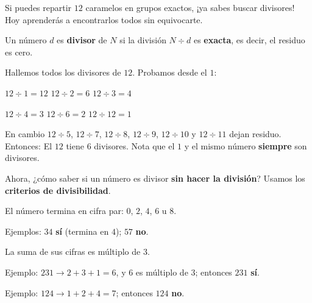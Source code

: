 \documentclass{xgodel-ficha}
\begin{document}
\portada

\begin{ficha}

\begin{pensamiento}
Si puedes repartir $12$ caramelos en grupos exactos, ¡ya sabes buscar
divisores! Hoy aprenderás a encontrarlos todos sin equivocarte.
\end{pensamiento}

Un número $d$ es \textbf{divisor} de $N$ si la división $N \div d$ es
\textbf{exacta}, es decir, el residuo es cero.


Hallemos todos los divisores de $12$. Probamos desde el $1$:
\par\smallskip
$12 \div 1 = 12$ \quad $12 \div 2 = 6$ \quad $12 \div 3 = 4$
\par\smallskip
$12 \div 4 = 3$ \quad $12 \div 6 = 2$ \quad $12 \div 12 = 1$
\par\smallskip
En cambio $12 \div 5$, $12 \div 7$, $12 \div 8$, $12 \div 9$, $12 \div 10$
y $12 \div 11$ dejan residuo. Entonces:
El $12$ tiene $6$ divisores. Nota que el $1$ y el mismo número
\textbf{siempre} son divisores.

\begin{globo}
Ahora, ¿cómo saber si un número es divisor \textbf{sin hacer la división}?
Usamos los \textbf{criterios de divisibilidad}.
\end{globo}


\begin{apartados}

\item {}
  El número termina en cifra par: $0$, $2$, $4$, $6$ u $8$.
  \par\smallskip
  Ejemplos: $34$ \textbf{sí} (termina en $4$); \; $57$ \textbf{no}.

\item {}
  La suma de sus cifras es múltiplo de $3$.
  \par\smallskip
  Ejemplo: $231 \rightarrow 2 + 3 + 1 = 6$, y $6$ es múltiplo de $3$;
  entonces $231$ \textbf{sí}.
  \par\smallskip
  Ejemplo: $124 \rightarrow 1 + 2 + 4 = 7$; entonces $124$ \textbf{no}.


\end{apartados}
\end{ficha}
\end{document}
